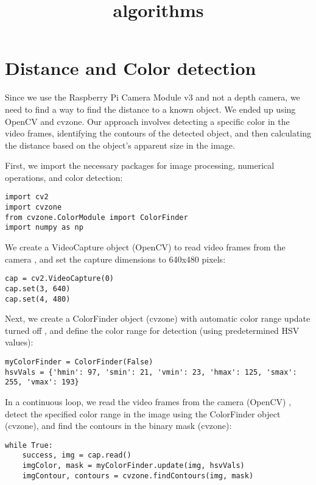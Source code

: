 \title{algorithms}


\section{Distance and Color detection}

Since we use the Raspberry Pi Camera Module v3 and not a depth camera, we need to find a way to find the distance to a known object. We ended up using OpenCV and cvzone. Our approach involves detecting a specific color in the video frames, identifying the contours of the detected object, and then calculating the distance based on the object's apparent size in the image.

First, we import the necessary packages for image processing, numerical operations, and color detection:

\begin{lstlisting}[language=PythonPlus]
import cv2
import cvzone
from cvzone.ColorModule import ColorFinder
import numpy as np
\end{lstlisting}

We create a VideoCapture object (OpenCV) to read video frames from the camera , and set the capture dimensions to 640x480 pixels:

\begin{lstlisting}[language=PythonPlus]
cap = cv2.VideoCapture(0)
cap.set(3, 640)
cap.set(4, 480)
\end{lstlisting}

Next, we create a ColorFinder object (cvzone) with automatic color range update turned off , and define the color range for detection (using predetermined HSV values):

\begin{lstlisting}[language=PythonPlus]
myColorFinder = ColorFinder(False)
hsvVals = {'hmin': 97, 'smin': 21, 'vmin': 23, 'hmax': 125, 'smax': 255, 'vmax': 193}
\end{lstlisting}

In a continuous loop, we read the video frames from the camera (OpenCV) , detect the specified color range in the image using the ColorFinder object (cvzone), and find the contours in the binary mask (cvzone):

\begin{lstlisting}[language=PythonPlus]
while True:
    success, img = cap.read()
    imgColor, mask = myColorFinder.update(img, hsvVals)
    imgContour, contours = cvzone.findContours(img, mask)
\end{lstlisting}

